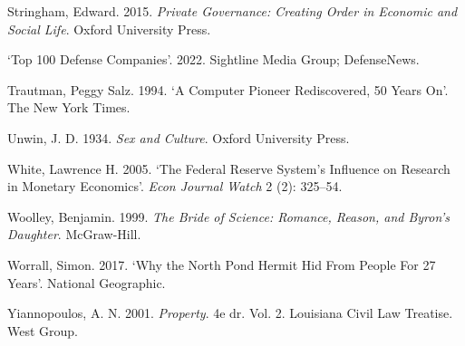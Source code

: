 \documentclass[
  a5paper,
  smalldemyvopaper,11pt,twoside,onecolumn,openright,extrafontsizes,
hidelinks]{memoir}
\newlength{\cslhangindent}
\newenvironment{CSLReferences}[2] %
 {\begin{list}{}{%
  \setlength{\itemindent}{0pt}
  \setlength{\leftmargin}{0pt}
  \setlength{\parsep}{0pt}
  \ifodd #1
   \setlength{\leftmargin}{\cslhangindent}
   \setlength{\itemindent}{-1\cslhangindent}
  \fi
  \setlength{\itemsep}{#2\baselineskip}}}
 {\end{list}}
\begin{document}
\begin{CSLReferences}{1}{0}
Stringham, Edward. 2015. \emph{Private Governance: Creating Order in
Economic and Social Life}. Oxford University Press.

{`Top 100 Defense Companies'}. 2022. Sightline Media Group; DefenseNews.

Trautman, Peggy Salz. 1994. {`A Computer Pioneer Rediscovered, 50 Years
On'}. The New York Times.

Unwin, J. D. 1934. \emph{Sex and Culture}. Oxford University Press.

White, Lawrence H. 2005. {`The Federal Reserve System's Influence on
Research in Monetary Economics'}. \emph{Econ Journal Watch} 2 (2):
325--54.

Woolley, Benjamin. 1999. \emph{The Bride of Science: Romance, Reason,
and Byron's Daughter}. McGraw-Hill.

Worrall, Simon. 2017. {`Why the North Pond Hermit Hid From People For 27
Years'}. National Geographic.

Yiannopoulos, A. N. 2001. \emph{Property}. 4e dr. Vol. 2. Louisiana
Civil Law Treatise. West Group.

\end{CSLReferences}


\backmatter
\end{document}
